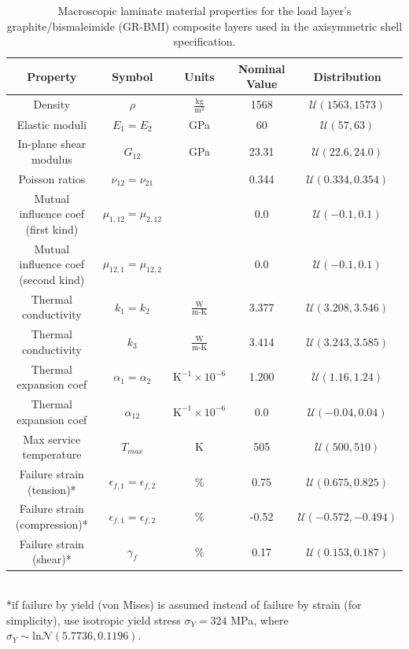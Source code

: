 \documentclass{article}
\begin{document}
\begin{table}
\caption[Gr-BMI material properties]{Macroscopic laminate material properties for the load layer's graphite/bismaleimide (GR-BMI) composite layers used in the axisymmetric shell specification.}
\label{tab:matPropGR-BMI}
\begin{center}
\begin{tabular}[]{ c | c | c | c | c }
\textbf{Property} & \textbf{Symbol} & \textbf{Units} & \textbf{Nominal Value} & \textbf{Distribution} \\ \hline
Density & $\rho$ & $\frac{\textrm{kg}}{\textrm{m}^3}$ & 1568 & $\mathcal{U}(1563,1573)$ \\ \hline
Elastic moduli & $E_{1} = E_{2}$ & GPa & 60 & $\mathcal{U}(57,63)$ \\ \hline
In-plane shear modulus & $G_{12}$ & GPa & 23.31 & $\mathcal{U}(22.6,24.0)$ \\ \hline
Poisson ratios & $\nu_{12} = \nu_{21}$ & & 0.344 & $\mathcal{U}(0.334,0.354)$\\ \hline
Mutual influence coef (first kind) & $\mu_{1,12} = \mu_{2,12}$ & & 0.0 & $\mathcal{U}(-0.1,0.1)$ \\ \hline
Mutual influence coef (second kind) & $\mu_{12,1} = \mu_{12,2}$ & & 0.0 & $\mathcal{U}(-0.1,0.1)$ \\ \hline
Thermal conductivity & $k_{1} = k_{2}$ & $\frac{\textrm{W}}{\textrm{m-K}}$ & 3.377 & $\mathcal{U}(3.208,3.546)$ \\ \hline
Thermal conductivity & $k_{3}$ & $\frac{\textrm{W}}{\textrm{m-K}}$ & 3.414 & $\mathcal{U}(3.243,3.585)$ \\ \hline
Thermal expansion coef & $\alpha_{1} = \alpha_{2}$ & $\textrm{K}^{-1} \times 10^{-6}$ & 1.200 & $\mathcal{U}(1.16,1.24)$ \\ \hline
Thermal expansion coef & $\alpha_{12}$ & $\textrm{K}^{-1} \times 10^{-6}$ & 0.0 & $\mathcal{U}(-0.04,0.04)$ \\ \hline \hline
Max service temperature & $T_{max}$ & K & 505 & $\mathcal{U}(500,510)$ \\ \hline
Failure strain (tension)* & $\epsilon_{f,1} = \epsilon_{f,2}$ & \% & 0.75 & $\mathcal{U}(0.675,0.825)$ \\ \hline
Failure strain (compression)* & $\epsilon_{f,1} = \epsilon_{f,2}$ & \% & -0.52 & $\mathcal{U}(-0.572,-0.494)$ \\ \hline
Failure strain (shear)* & $\gamma_{f}$ & \% & 0.17 & $\mathcal{U}(0.153,0.187)$ \\ \hline
\end{tabular} \\
*if failure by yield (von Mises) is assumed instead of failure by strain (for simplicity), use isotropic yield stress $\sigma_Y = 324$ MPa, where $\sigma_Y \sim \textrm{ln}\mathcal{N}(5.7736,0.1196)$.
\end{center}
\end{table}
\end{document}
